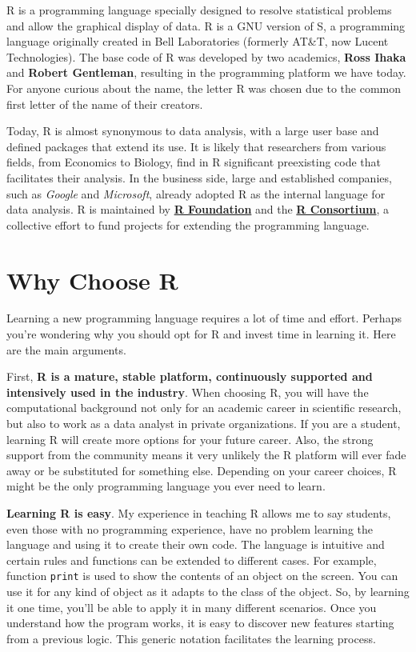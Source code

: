 \documentclass[11pt,]{book}
\begin{document}
R is a programming language specially designed to resolve statistical
problems and allow the graphical display of data. R is a GNU version of
S, a programming language originally created in Bell Laboratories
(formerly AT\&T, now Lucent Technologies). The base code of R was
developed by two academics, \textbf{Ross Ihaka} and \textbf{Robert
Gentleman}, resulting in the programming platform we have today. For
anyone curious about the name, the letter R was chosen due to the common
first letter of the name of their creators. 

Today, R is almost synonymous to data analysis, with a large user base
and defined packages that extend its use. It is likely that researchers
from various fields, from Economics to Biology, find in R significant
preexisting code that facilitates their analysis. In the business side,
large and established companies, such as \emph{Google} and
\emph{Microsoft}, already adopted R as the internal language for data
analysis. R is maintained by
\href{https://www.r-project.org/foundation/}{\textbf{R Foundation}} and
the \href{https://www.r-consortium.org/}{\textbf{R Consortium}}, a
collective effort to fund projects for extending the programming
language.  

\section{Why Choose R}\label{why-choose-r}

Learning a new programming language requires a lot of time and effort.
Perhaps you're wondering why you should opt for R and invest time in
learning it. Here are the main arguments.

First, \textbf{R is a mature, stable platform, continuously supported
and intensively used in the industry}. When choosing R, you will have
the computational background not only for an academic career in
scientific research, but also to work as a data analyst in private
organizations. If you are a student, learning R will create more options
for your future career. Also, the strong support from the community
means it very unlikely the R platform will ever fade away or be
substituted for something else. Depending on your career choices, R
might be the only programming language you ever need to learn.

\textbf{Learning R is easy}. My experience in teaching R allows me to
say students, even those with no programming experience, have no problem
learning the language and using it to create their own code. The
language is intuitive and certain rules and functions can be extended to
different cases. For example, function \texttt{print} is used to show
the contents of an object on the screen. You can use it for any kind of
object as it adapts to the class of the object. So, by learning it one
time, you'll be able to apply it in many different scenarios. Once you
understand how the program works, it is easy to discover new features
starting from a previous logic. This generic notation facilitates the
learning process.
\end{document}
